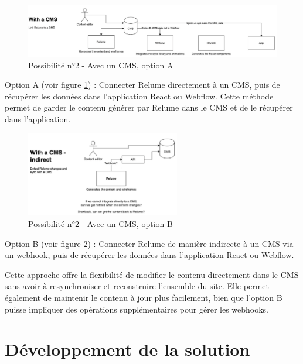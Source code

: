 \begin{figure}[h] 
  \centering
  \includegraphics[width=1\textwidth]{Includes/Images/connection2.png}
  \caption{Possibilité n°2 - Avec un CMS, option A}
  \label{fig: Possibilité n°2 - Avec un CMS, option A}
\end{figure} 

Option A (voir figure \ref{fig: Possibilité n°2 - Avec un CMS, option A}) : Connecter Relume directement à un CMS, puis de récupérer les données dans l'application React ou Webflow. Cette méthode permet de garder le contenu générer par Relume dans le CMS et de le récupérer dans l'application.

\begin{figure}[h] 
  \centering
  \includegraphics[width=0.6\textwidth]{Includes/Images/connection3.png}
  \caption{Possibilité n°2 - Avec un CMS, option B}
  \label{fig: Possibilité n°2 - Avec un CMS, option B}
\end{figure} 

Option B (voir figure \ref{fig: Possibilité n°2 - Avec un CMS, option B}) : Connecter Relume de manière indirecte à un CMS via un webhook, puis de récupérer les données dans l'application React ou Webflow.

Cette approche offre la flexibilité de modifier le contenu directement dans le CMS sans avoir à resynchroniser et reconstruire l'ensemble du site. Elle permet également de maintenir le contenu à jour plus facilement, bien que l'option B puisse impliquer des opérations supplémentaires pour gérer les webhooks.

\section{Développement de la solution}

